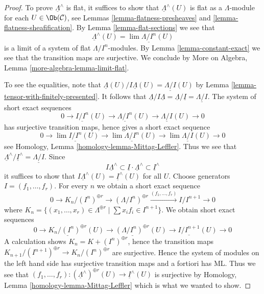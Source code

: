 \begin{proof}
To prove $\underline{\Lambda}^\wedge$ is flat, it suffices to show that
$\underline{\Lambda}^\wedge(U)$ is flat as a $\Lambda$-module for each
$U \in \Ob(\mathcal{C})$, see
Lemmas \ref{lemma-flatness-presheaves} and
\ref{lemma-flatness-sheafification}.
By Lemma \ref{lemma-flat-sections} we see that
$$
\underline{\Lambda}^\wedge(U) = \lim \underline{\Lambda/I^n}(U)
$$
is a limit of a system of flat $\Lambda/I^n$-modules.
By Lemma \ref{lemma-constant-exact} we see that the transition maps
are surjective. We conclude by
More on Algebra, Lemma \ref{more-algebra-lemma-limit-flat}.

\medskip\noindent
To see the equalities, note that
$\underline{\Lambda}(U)/I\underline{\Lambda}(U) = \underline{\Lambda/I}(U)$
by Lemma \ref{lemma-tensor-with-finitely-presented}.
It follows that $\underline{\Lambda}/I\underline{\Lambda} =
\underline{\Lambda}/\underline{I} = \underline{\Lambda/I}$. The system
of short exact sequences
$$
0 \to \underline{I/I^n}(U) \to \underline{\Lambda/I^n}(U) \to
\underline{\Lambda/I}(U) \to 0
$$
has surjective transition maps, hence gives a short exact sequence
$$
0 \to \lim \underline{I/I^n}(U) \to \lim \underline{\Lambda/I^n}(U) \to
\lim \underline{\Lambda/I}(U) \to 0
$$
see Homology, Lemma \ref{homology-lemma-Mittag-Leffler}. Thus we see that
$\underline{\Lambda}^\wedge/\underline{I}^\wedge =
\underline{\Lambda/I}$. Since
$$
I \underline{\Lambda}^\wedge \subset
\underline{I} \cdot \underline{\Lambda}^\wedge \subset
\underline{I}^\wedge
$$
it suffices to show that
$I \underline{\Lambda}^\wedge(U) = \underline{I}^\wedge(U)$
for all $U$. Choose generators $I = (f_1, \ldots, f_r)$.
For every $n$ we obtain a short exact sequence
$$
0 \to K_n/(I^n)^{\oplus r} \to (\Lambda/I^n)^{\oplus r}
\xrightarrow{(f_1, \ldots, f_r)}
I/I^{n + 1} \to 0
$$
where $K_n =
\{(x_1, \ldots, x_r) \in \Lambda^{\oplus r} \mid \sum x_i f_i \in I^{n + 1}\}$.
We obtain short exact sequences
$$
0 \to \underline{K_n/(I^n)^{\oplus r}}(U) \to
\underline{(\Lambda/I^n)^{\oplus r}}(U) \to
\underline{I/I^{n + 1}}(U) \to 0
$$
A calculation shows $K_n = K + (I^n)^{\oplus r}$, hence
the transition maps
$K_{n + 1}/(I^{n + 1})^{\oplus r} \to K_n/(I^n)^{\oplus r}$ are surjective.
Hence the system of modules on the left hand side has surjective transition
maps and a fortiori has ML. Thus we see that
$(f_1, \ldots, f_r) :
(\underline{\Lambda}^\wedge)^{\oplus r}(U) \to \underline{I}^\wedge(U)$
is surjective by
Homology, Lemma \ref{homology-lemma-Mittag-Leffler}
which is what we wanted to show.
\end{proof}

